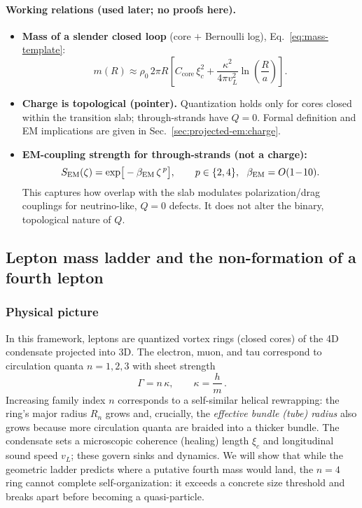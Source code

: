 \paragraph{Working relations (used later; no proofs here).}
\begin{itemize}
  \item \textbf{Mass of a slender closed loop} (core $+$ Bernoulli log), Eq.~\eqref{eq:mass-template}:
  \[
  m(R)\approx \rho_0\,2\pi R\left[
  C_{\mathrm{core}}\,\xi_c^2+\frac{\kappa^2}{4\pi v_L^2}\ln\!\left(\frac{R}{a}\right)\right].
  \]
  \item \textbf{Charge is topological (pointer).} Quantization holds only for cores closed within the transition slab; through-strands have $Q=0$. Formal definition and EM implications are given in Sec.~\ref{sec:projected-em:charge}.
  \item \textbf{EM-coupling strength for through-strands (not a charge):}
  \[
  S_{\rm EM}(\zeta)=\exp\!\big[-\beta_{\rm EM}\,\zeta^{\,p}\big],\qquad
  p\in\{2,4\},\ \ \beta_{\rm EM}=O(1\!-\!10).
  \]
  This captures how overlap with the slab modulates polarization/drag couplings for neutrino-like, $Q=0$ defects. It does not alter the binary, topological nature of $Q$.
\end{itemize}

\subsection{Lepton mass ladder and the non-formation of a fourth lepton}\label{sec:leptons}

\subsubsection{Physical picture}
In this framework, leptons are quantized vortex rings (closed cores) of the 4D condensate projected into 3D. The electron, muon, and tau correspond to circulation quanta \(n=1,2,3\) with sheet strength
\[
\Gamma=n\,\kappa,\qquad \kappa=\frac{h}{m}\,.
\]
Increasing family index \(n\) corresponds to a self-similar helical rewrapping: the ring’s major radius \(R_n\) grows and, crucially, the \emph{effective bundle (tube) radius} also grows because more circulation quanta are braided into a thicker bundle. The condensate sets a microscopic coherence (healing) length \(\xi_c\) and longitudinal sound speed \(v_L\); these govern sinks and dynamics. We will show that while the geometric ladder predicts where a putative fourth mass would land, the \(n{=}4\) ring cannot complete self-organization: it exceeds a concrete size threshold and breaks apart before becoming a quasi-particle.

